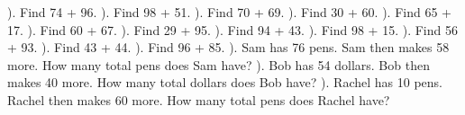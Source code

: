 \documentclass{article}%
\begin{document}
). Find 74 + 96.%
\newline%
\newline%
). Find 98 + 51.%
\newline%
\newline%
). Find 70 + 69.%
\newline%
\newline%
). Find 30 + 60.%
\newline%
\newline%
). Find 65 + 17.%
\newline%
\newline%
). Find 60 + 67.%
\newline%
\newline%
). Find 29 + 95.%
\newline%
\newline%
). Find 94 + 43.%
\newline%
\newline%
). Find 98 + 15.%
\newline%
\newline%
). Find 56 + 93.%
\newline%
\newline%
). Find 43 + 44.%
\newline%
\newline%
). Find 96 + 85.%
\newline%
\newline%
). Sam has 76 pens. Sam then makes 58 more. How many total pens does Sam have?%
\newline%
\newline%
). Bob has 54 dollars. Bob then makes 40 more. How many total dollars does Bob have?%
\newline%
\newline%
). Rachel has 10 pens. Rachel then makes 60 more. How many total pens does Rachel have?%
\end{document}
